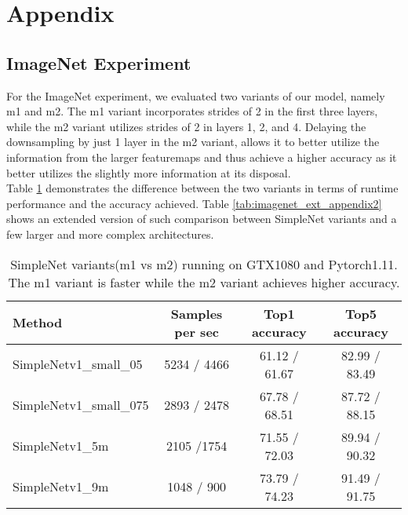 \documentclass{article} \usepackage{lets_keepit_simple,times}
\begin{document}
\section{Appendix}
\subsection{ImageNet Experiment}
For the ImageNet experiment, we evaluated two variants of our model, namely m1 and m2. The m1 variant incorporates strides of 2 in the first three layers, while the m2 variant utilizes strides of 2 in layers 1, 2, and 4. Delaying the downsampling by just 1 layer in the m2 variant, allows it to better utilize the information from the larger featuremaps and thus achieve a higher accuracy as it better utilizes the slightly more information at its disposal.\\
Table \ref{tab:imagenet_ext_appendix} demonstrates the difference between the two variants in terms of runtime performance and the accuracy achieved. Table \ref{tab:imagenet_ext_appendix2} shows an extended version of such comparison between SimpleNet variants and a few larger and more complex architectures.     

\begin{table}[h!]
\caption{SimpleNet variants(m1 vs m2) running on GTX1080 and Pytorch1.11. The m1 variant is faster while the m2 variant achieves higher accuracy. }\label{tab:imagenet_ext_appendix}
\begin{center}
\begin{tabular}{lccc}
\textbf{Method}          &\textbf{Samples per sec}   &\textbf{Top1 accuracy}       &\textbf{Top5 accuracy}\\ \hline
SimpleNetv1\_small\_05	      &5234 / 4466        &61.12 / 61.67       &82.99 / 83.49  \\ 
SimpleNetv1\_small\_075      &2893 / 2478        &67.78 / 68.51       &87.72 / 88.15  \\ 
SimpleNetv1\_5m              &2105 /1754         &71.55 / 72.03       &89.94 / 90.32  \\
SimpleNetv1\_9m	            &1048 / 900         &73.79 / 74.23        &91.49 / 91.75   \\ 
\end{tabular}
\end{center}
\end{table}
\end{document}
